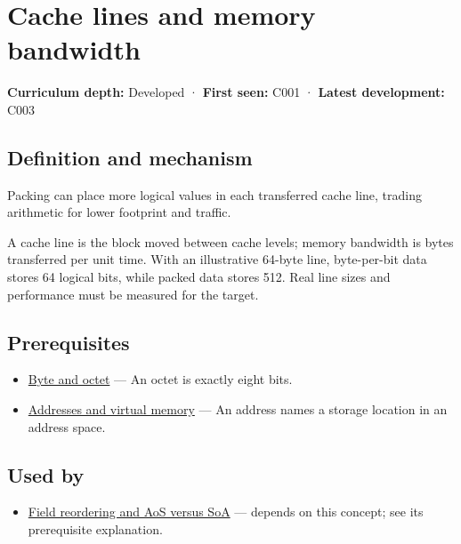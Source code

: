 \hypertarget{appendix-e4ccdbab8320}{}\label{referencestart:appendix-e4ccdbab8320}
\section{Cache lines and memory bandwidth}\label{appendix-e4ccdbab8320-cache-lines-and-memory-bandwidth}

\textbf{Curriculum depth:} Developed · \textbf{First seen:} C001 · \textbf{Latest development:} C003

\begin{allmightroledefinition}

\subsection{Definition and mechanism}\label{appendix-e4ccdbab8320-definition-and-mechanism}

Packing can place more logical values in each transferred cache line, trading arithmetic for lower footprint and traffic.

\end{allmightroledefinition}

A cache line is the block moved between cache levels; memory bandwidth is bytes transferred per unit time. With an illustrative 64-byte line, byte-per-bit data stores 64 logical bits, while packed data stores 512. Real line sizes and performance must be measured for the target.

\subsection{Prerequisites}\label{appendix-e4ccdbab8320-prerequisites}

\begin{itemize}
\tightlist
\item
  \hyperref[appendix-5bee2df85484]{Byte and octet} --- An octet is exactly eight bits.
\item
  \hyperref[appendix-18ee4f913c3c]{Addresses and virtual memory} --- An address names a storage location in an address space.
\end{itemize}

\subsection{Used by}\label{appendix-e4ccdbab8320-used-by}

\begin{itemize}
\tightlist
\item
  \hyperref[appendix-5522ad176ca0]{Field reordering and AoS versus SoA} --- depends on this concept; see its prerequisite explanation.
\end{itemize}


